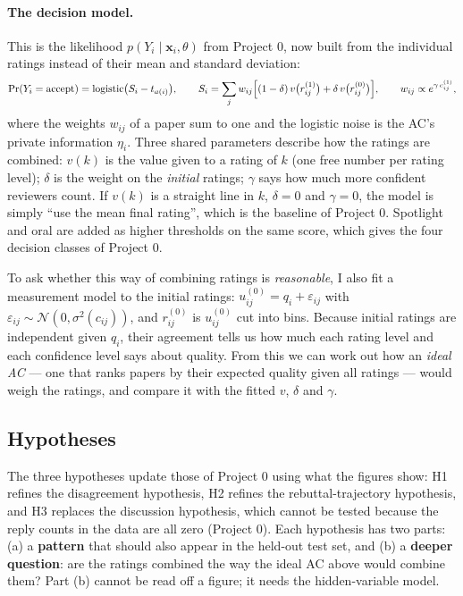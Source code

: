 \documentclass[11pt]{article}
\begin{document}
\paragraph{The decision model.} This is the likelihood $p(Y_i\mid \mathbf x_i,\theta)$ from Project 0, now built from the individual ratings instead of their mean and standard deviation:
\[
\Pr(Y_i=\text{accept}) = \operatorname{logistic}\bigl(S_i - t_{a(i)}\bigr),\qquad
S_i=\sum_{j} w_{ij}\Bigl[(1-\delta)\,v\bigl(r^{(1)}_{ij}\bigr)+\delta\, v\bigl(r^{(0)}_{ij}\bigr)\Bigr],\qquad
w_{ij}\propto e^{\gamma\, c^{(1)}_{ij}},
\]
where the weights $w_{ij}$ of a paper sum to one and the logistic noise is the AC's private information $\eta_i$. Three shared parameters describe how the ratings are combined:
$v(k)$ is the value given to a rating of $k$ (one free number per rating level);
$\delta$ is the weight on the \emph{initial} ratings;
$\gamma$ says how much more confident reviewers count.
If $v(k)$ is a straight line in $k$, $\delta=0$ and $\gamma=0$, the model is simply ``use the mean final rating'', which is the baseline of Project 0. Spotlight and oral are added as higher thresholds on the same score, which gives the four decision classes of Project 0.

To ask whether this way of combining ratings is \emph{reasonable}, I also fit a measurement model to the initial ratings: $u^{(0)}_{ij}=q_i+\varepsilon_{ij}$ with $\varepsilon_{ij}\sim\mathcal N(0,\sigma^2(c_{ij}))$, and $r^{(0)}_{ij}$ is $u^{(0)}_{ij}$ cut into bins. Because initial ratings are independent given $q_i$, their agreement tells us how much each rating level and each confidence level says about quality. From this we can work out how an \emph{ideal AC} --- one that ranks papers by their expected quality given all ratings --- would weigh the ratings, and compare it with the fitted $v$, $\delta$ and $\gamma$.

\subsection{Hypotheses}
\label{sec:hyp}

The three hypotheses update those of Project 0 using what the figures show: H1 refines the disagreement hypothesis, H2 refines the rebuttal-trajectory hypothesis, and H3 replaces the discussion hypothesis, which cannot be tested because the reply counts in the data are all zero (Project 0). Each hypothesis has two parts: (a) a \textbf{pattern} that should also appear in the held-out test set, and (b) a \textbf{deeper question}: are the ratings combined the way the ideal AC above would combine them? Part (b) cannot be read off a figure; it needs the hidden-variable model.
\end{document}
